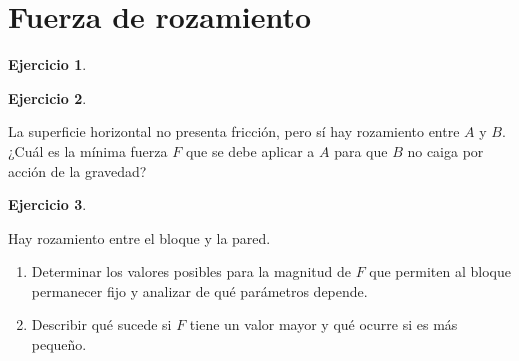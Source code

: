 \documentclass[a4paper,12pt,twoside]{book}
\newtheorem{ejercicio}{{Ejercicio}}[chapter]
\begin{document}
\section{Fuerza de rozamiento}

\begin{mdframed}[style=ejercicio-conceptual]
    \begin{ejercicio}
    \end{ejercicio}
    \begin{center}
        \def\svgwidth{0.5\linewidth}
        
    \end{center}
    \textit{}
\end{mdframed}

\begin{mdframed}[style=ejercicio-facil]
    \begin{ejercicio}
    \end{ejercicio}
    \begin{center}
        \def\svgwidth{0.5\linewidth}
        
    \end{center}
    La superficie horizontal no presenta fricción, pero sí hay rozamiento entre $A$ y $B$.
    ¿Cuál es la mínima fuerza $F$ que se debe aplicar a $A$ para que $B$ no caiga por acción de la gravedad?
\end{mdframed}

\begin{mdframed}[style=ejercicio-intermedio]
    \begin{ejercicio}
    \end{ejercicio}
    Hay rozamiento entre el bloque y la pared.
    \begin{center}
        \def\svgwidth{0.5\linewidth}
        
    \end{center}
    \begin{enumerate}
        \item Determinar los valores posibles para la magnitud de $F$ que permiten al bloque permanecer fijo y analizar de qué parámetros depende.
        \item Describir qué sucede si $F$ tiene un valor mayor y qué ocurre si es más pequeño.
    \end{enumerate}
\end{mdframed}
\end{document}
